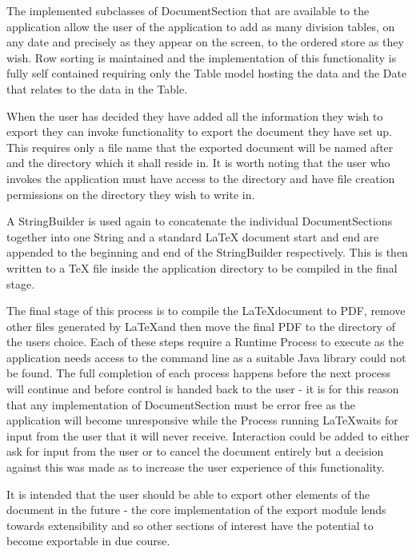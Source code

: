 The implemented subclasses of DocumentSection that are available to
the application allow the user of the application to add as many
division tables, on any date and precisely as they appear on the
screen, to the ordered store as they wish. Row sorting is maintained
and the implementation of this functionality is fully self contained
requiring only the Table model hosting the data and the Date that
relates to the data in the Table.

When the user has decided they have added all the information they
wish to export they can invoke functionality to export the document
they have set up. This requires only a file name that the exported
document will be named after and the directory which it shall
reside in. It is worth noting that the user who invokes the
application must have access to the directory and have file creation
permissions on the directory they wish to write in.

A StringBuilder is used again to concatenate the individual
DocumentSections together into one String and a standard \LaTeX
document start and end are appended to the beginning and end of the
StringBuilder respectively. This is then written to a TeX file inside
the application directory to be compiled in the final stage.

The final stage of this process is to compile the \LaTeX document to
PDF, remove other files generated by \LaTeX and then move the final
PDF to the directory of the users choice. Each of these steps require
a Runtime Process to execute as the application needs access to the
command line as a suitable Java library could not be found. The full
completion of each process happens before the next process will
continue and before control is handed back to the user - it is for
this reason that any implementation of DocumentSection must be error
free as the application will become unresponsive while the Process
running \LaTeX waits for input from the user that it will never
receive. Interaction could be added to either ask for input from the
user or to cancel the document entirely but a decision against this
was made as to increase the user experience of this functionality.

It is intended that the user should be able to export other elements
of the document in the future - the core implementation of the export
module lends towards extensibility and so other sections of interest
have the potential to become exportable in due course.
